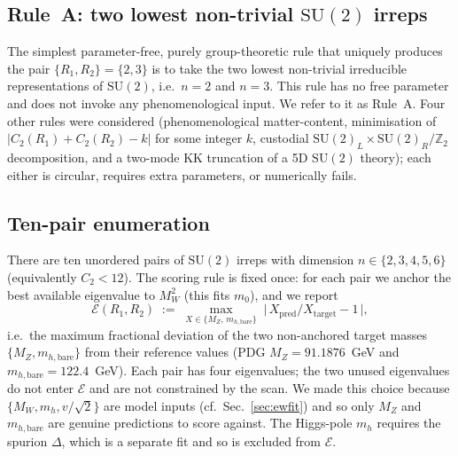 \documentclass[%
 aps,
 prd,
 reprint,
 nofootinbib,
 superscriptaddress,
 amsmath,
 amssymb,
]{revtex4-2}
\begin{document}
\subsection{Rule~A: two lowest non-trivial $\mathrm{SU}(2)$ irreps}

The simplest parameter-free, purely group-theoretic rule that uniquely produces the pair $\{R_1,R_2\}=\{2,3\}$ is to take the two lowest non-trivial irreducible representations of $\mathrm{SU}(2)$, i.e.\ $n=2$ and $n=3$. This rule has no free parameter and does not invoke any phenomenological input. We refer to it as Rule~A. Four other rules were considered (phenomenological matter-content, minimisation of $|C_2(R_1)+C_2(R_2)-k|$ for some integer $k$, custodial $\mathrm{SU}(2)_L\times\mathrm{SU}(2)_R/\mathbb{Z}_2$ decomposition, and a two-mode KK truncation of a 5D $\mathrm{SU}(2)$ theory); each either is circular, requires extra parameters, or numerically fails.

\subsection{Ten-pair enumeration}\label{sec:scan}

There are ten unordered pairs of $\mathrm{SU}(2)$ irreps with dimension $n\in\{2,3,4,5,6\}$ (equivalently $C_2<12$). The scoring rule is fixed once: for each pair we anchor the best available eigenvalue to $M_W^2$ (this fits $m_0$), and we report
\begin{equation}\label{eq:scoring}
\mathcal{E}(R_1,R_2)\;:=\;\max_{X\in\{M_Z,\,m_{h,\mathrm{bare}}\}}\;\bigl|\,X_{\mathrm{pred}}/X_{\mathrm{target}}-1\,\bigr|,
\end{equation}
i.e.\ the maximum fractional deviation of the two non-anchored target masses $\{M_Z,m_{h,\mathrm{bare}}\}$ from their reference values (PDG $M_Z=91.1876$~GeV and $m_{h,\mathrm{bare}}=122.4$~GeV). Each pair has four eigenvalues; the two unused eigenvalues do not enter $\mathcal{E}$ and are not constrained by the scan. We made this choice because $\{M_W,m_h,v/\sqrt{2}\}$ are model inputs (cf.\ Sec.~\ref{sec:ewfit}) and so only $M_Z$ and $m_{h,\mathrm{bare}}$ are genuine predictions to score against. The Higgs-pole $m_h$ requires the spurion $\Delta$, which is a separate fit and so is excluded from $\mathcal{E}$.
\end{document}
